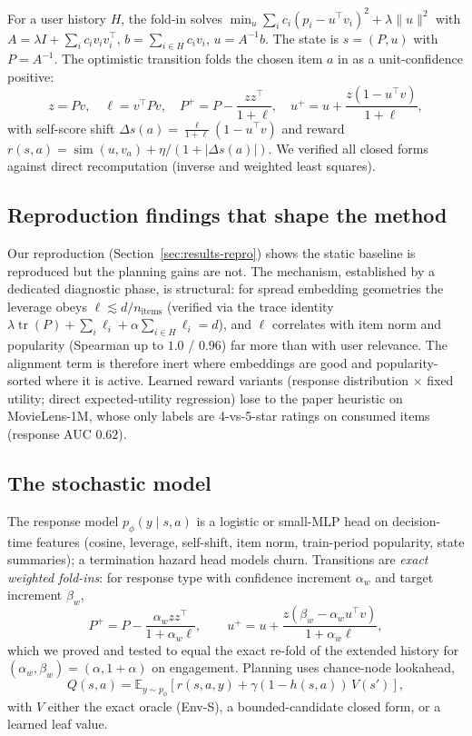 \documentclass[11pt,a4paper]{article}
\newcommand{\E}{\mathbb{E}}
\begin{document}
For a user history $H$, the fold-in solves
$\min_u \sum_i c_i (p_i - u^{\top} v_i)^2 + \lambda \|u\|^2$ with
$A = \lambda I + \sum_i c_i v_i v_i^{\top}$, $b = \sum_{i \in H} c_i v_i$, $u = A^{-1} b$.
The state is $s = (P, u)$ with $P = A^{-1}$. The optimistic transition folds the chosen
item $a$ in as a unit-confidence positive:
\begin{equation}
  z = Pv, \quad \ell = v^{\top} P v, \quad
  P^{+} = P - \frac{zz^{\top}}{1+\ell}, \quad
  u^{+} = u + \frac{z(1 - u^{\top} v)}{1 + \ell},
\end{equation}
with self-score shift $\Delta s(a) = \frac{\ell}{1+\ell}(1 - u^{\top} v)$ and reward
$r(s,a) = \operatorname{sim}(u, v_a) + \eta / (1 + |\Delta s(a)|)$. We verified all
closed forms against direct recomputation (inverse and weighted least squares).

\subsection{Reproduction findings that shape the method}

Our reproduction (Section~\ref{sec:results-repro}) shows the static baseline is
reproduced but the planning gains are not. The mechanism, established by a dedicated
diagnostic phase, is structural: for spread embedding geometries the leverage obeys
$\ell \lesssim d / n_{\text{items}}$ (verified via the trace identity
$\lambda \operatorname{tr}(P) + \sum_i \ell_i + \alpha \sum_{i \in H} \ell_i = d$), and
$\ell$ correlates with item norm and popularity (Spearman up to $1.0$ / $0.96$) far more
than with user relevance. The alignment term is therefore inert where embeddings are
good and popularity-sorted where it is active. Learned reward variants (response
distribution $\times$ fixed utility; direct expected-utility regression) lose to the
paper heuristic on MovieLens-1M, whose only labels are 4-vs-5-star ratings on consumed
items (response AUC $0.62$).

\subsection{The stochastic model}

The response model $p_\phi(y \mid s, a)$ is a logistic or small-MLP head on decision-time
features (cosine, leverage, self-shift, item norm, train-period popularity, state
summaries); a termination hazard head models churn. Transitions are \emph{exact weighted
fold-ins}: for response type with confidence increment $\alpha_w$ and target increment
$\beta_w$,
\begin{equation}
  P^{+} = P - \frac{\alpha_w z z^{\top}}{1 + \alpha_w \ell}, \qquad
  u^{+} = u + \frac{z(\beta_w - \alpha_w u^{\top} v)}{1 + \alpha_w \ell},
\end{equation}
which we proved and tested to equal the exact re-fold of the extended history for
$(\alpha_w, \beta_w) = (\alpha, 1+\alpha)$ on engagement. Planning uses chance-node
lookahead,
\begin{equation}
  Q(s,a) = \E_{y \sim p_\phi} \left[ r(s,a,y) + \gamma (1 - h(s,a)) \, V(s') \right],
\end{equation}
with $V$ either the exact oracle (Env-S), a bounded-candidate closed form, or a learned
leaf value.
\end{document}
